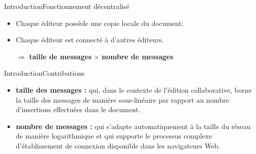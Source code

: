 \begin{frame}{Introduction}{Fonctionnement décentralisé}
  
  \hspace{-1cm}
  \begin{minipage}{0.54\textwidth}
    \begin{itemize}
      \item Chaque éditeur possède une copie locale du document;
      \item Chaque éditeur est connecté à d'autres éditeurs.
      \vspace{0.5cm}
    \end{itemize}
  \end{minipage}
  \hfill
  \begin{minipage}{0.44\textwidth}
    \begin{center}
      
    \end{center}
  \end{minipage}

  
  \vspace{1cm}
  \large
  \begin{itemize}
  \item [$\Rightarrow$] \textbf{taille de messages} $\times$ \textbf{nombre de messages}
  \end{itemize}

\end{frame}

\begin{frame}{Introduction}{Contributions}
    
  \begin{itemize}
  \item \textbf{taille des messages :} \LSEQ qui, dans le contexte de l'édition
    collaborative, borne la taille des messages de manière sous-linéaire par
    rapport au nombre d'insertions effectuées dans le document.
    \vspace{1cm}
  \item \textbf{nombre de messages :} \SPRAY qui s'adapte automatiquement à la
    taille du réseau de manière logarithmique et qui supporte le processus
    complexe d'établissement de connexion disponible dans les navigateurs Web.
  \end{itemize}

\end{frame}


